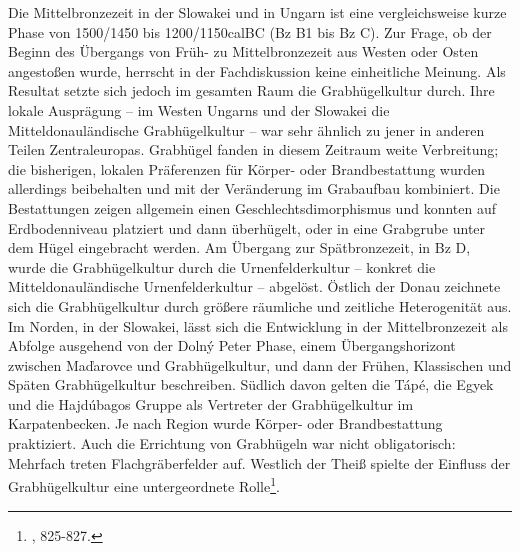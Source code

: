 \documentclass[openany,twoside,twocolumn]{book}
\let\rmarkdownfootnote\footnote%
\def\footnote{\protect\rmarkdownfootnote}
\begin{document}
Die Mittelbronzezeit in der Slowakei und in Ungarn ist eine
vergleichsweise kurze Phase von 1500/1450 bis 1200/1150calBC (Bz B1 bis
Bz C). Zur Frage, ob der Beginn des Übergangs von Früh- zu
Mittelbronzezeit aus Westen oder Osten angestoßen wurde, herrscht in der
Fachdiskussion keine einheitliche Meinung. Als Resultat setzte sich
jedoch im gesamten Raum die Grabhügelkultur durch. Ihre lokale
Ausprägung -- im Westen Ungarns und der Slowakei die
Mitteldonauländische Grabhügelkultur -- war sehr ähnlich zu jener in
anderen Teilen Zentraleuropas. Grabhügel fanden in diesem Zeitraum weite
Verbreitung; die bisherigen, lokalen Präferenzen für Körper- oder
Brandbestattung wurden allerdings beibehalten und mit der Veränderung im
Grabaufbau kombiniert. Die Bestattungen zeigen allgemein einen
Geschlechtsdimorphismus und konnten auf Erdbodenniveau platziert und
dann überhügelt, oder in eine Grabgrube unter dem Hügel eingebracht
werden. Am Übergang zur Spätbronzezeit, in Bz D, wurde die
Grabhügelkultur durch die Urnenfelderkultur -- konkret die
Mitteldonauländische Urnenfelderkultur -- abgelöst. Östlich der Donau
zeichnete sich die Grabhügelkultur durch größere räumliche und zeitliche
Heterogenität aus. Im Norden, in der Slowakei, lässt sich die
Entwicklung in der Mittelbronzezeit als Abfolge ausgehend von der Dolný
Peter Phase, einem Übergangshorizont zwischen Maďarovce und
Grabhügelkultur, und dann der Frühen, Klassischen und Späten
Grabhügelkultur beschreiben. Südlich davon gelten die Tápé, die Egyek
und die Hajdúbagos Gruppe als Vertreter der Grabhügelkultur im
Karpatenbecken. Je nach Region wurde Körper- oder Brandbestattung
praktiziert. Auch die Errichtung von Grabhügeln war nicht obligatorisch:
Mehrfach treten Flachgräberfelder auf. Westlich der Theiß spielte der
Einfluss der Grabhügelkultur eine untergeordnete Rolle\footnote{\textcite{markova_slovakia_2013},
  825-827.}.
\end{document}
